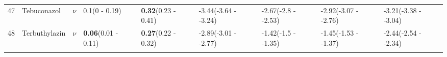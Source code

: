 \begin{longtable}{lp{2cm}p{0.6cm}p{1.8cm}p{1.8cm}p{1.8cm}p{1.8cm}p{1.8cm}p{1.8cm}}
  47 & Tebuconazol & $\nu$ & 0.1\newline (0 - 0.19) & \textbf{0.32}\newline (0.23 - 0.41) & -3.44\newline (-3.64 - -3.24) & -2.67\newline (-2.8 - -2.53) & -2.92\newline (-3.07 - -2.76) & -3.21\newline (-3.38 - -3.04) \\ 
  48 & Terbuthylazin & $\nu$ & \textbf{0.06}\newline (0.01 - 0.11) & \textbf{0.27}\newline (0.22 - 0.32) & -2.89\newline (-3.01 - -2.77) & -1.42\newline (-1.5 - -1.35) & -1.45\newline (-1.53 - -1.37) & -2.44\newline (-2.54 - -2.34) \\ 
   \bottomrule
\label{tab:var_model_coef}
\end{longtable}
\endgroup
